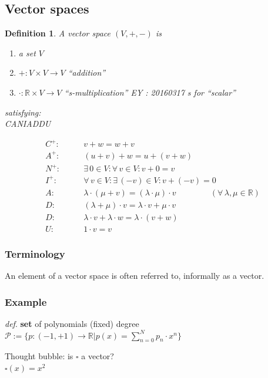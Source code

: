 \documentclass[10pt]{amsart}
\newtheorem{definition}{Definition}
\begin{document}
\begin{multicols*}{2}
\subsection{Vector spaces}

\begin{definition} A vector space $(V,+,-)$ is 
	\begin{enumerate}
		\item[(i)] a set $V$
		\item[(ii)] $+ : V\times V \to V$ \qquad ``addition''
		\item[(iii)] $\cdot : \mathbb{R} \times V \to V$ \qquad  ``s-multiplication'' EY : 20160317 s for ``scalar''
	\end{enumerate}
	satisfying: \\
	
	CANIADDU
	
	\[
	\begin{aligned}
	C^+ : & \qquad v+w = w+v \\
	A^+ : & \qquad (u+v)+w = u+(v+w) \\ 
	N^+ : & \qquad \exists \, 0 \in V : \forall \, v \in V : v+ 0 = v \\
	I^+ : & \qquad \forall \, v \in V : \exists \, (-v) \in V: v + (-v) = 0  \\
	A : & \qquad \lambda \cdot (\mu + v) = (\lambda \cdot \mu)\cdot v \qquad \qquad \, (\forall \, \lambda , \mu \in \mathbb{R} ) \\ 
	D : &  \qquad (\lambda + \mu ) \cdot v = \lambda \cdot v + \mu \cdot v \\
	D : &  \qquad \lambda \cdot v + \lambda \cdot w = \lambda \cdot (v+w)  \\ 
	U : &  \qquad 1 \cdot v = v 
	\end{aligned}
	\]
\end{definition}
\subsubsection*{Terminology} An element of a vector space is often referred to, informally as a vector.  

\subsubsection*{Example}
\emph{def}. \textbf{set} of polynomials (fixed) degree $\mathcal{P} := \lbrace p :(-1,+1) \to \mathbb{R} | p(x) = \sum_{n=0}^N p_n \cdot x^n \rbrace$

Thought bubble: is $\square $ a vector?  \\
\phantom{Thought bubble}$\square(x) = x^2$


\end{multicols*}
\end{document}
